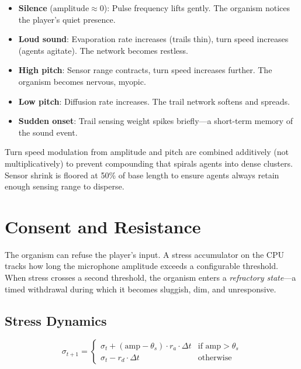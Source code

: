 \documentclass[12pt, titlepage]{article}
\begin{document}
\begin{itemize}
    \item \textbf{Silence} ($\text{amplitude} \approx 0$): Pulse frequency
    lifts gently. The organism notices the player's quiet presence.
    \item \textbf{Loud sound}: Evaporation rate increases (trails thin),
    turn speed increases (agents agitate). The network becomes restless.
    \item \textbf{High pitch}: Sensor range contracts, turn speed increases
    further. The organism becomes nervous, myopic.
    \item \textbf{Low pitch}: Diffusion rate increases. The trail network
    softens and spreads.
    \item \textbf{Sudden onset}: Trail sensing weight spikes briefly---a
    short-term memory of the sound event.
\end{itemize}

Turn speed modulation from amplitude and pitch are combined additively
(not multiplicatively) to prevent compounding that spirals agents into dense
clusters. Sensor shrink is floored at 50\% of base length to ensure agents
always retain enough sensing range to disperse.

\section{Consent and Resistance}
\label{sec:consent}

The organism can refuse the player's input. A stress accumulator on the CPU
tracks how long the microphone amplitude exceeds a configurable threshold.
When stress crosses a second threshold, the organism enters a
\textit{refractory state}---a timed withdrawal during which it becomes
sluggish, dim, and unresponsive.

\subsection{Stress Dynamics}

\begin{equation}
    \sigma_{t+1} = \begin{cases}
    \sigma_t + (\text{amp} - \theta_s) \cdot r_a \cdot \Delta t
        & \text{if } \text{amp} > \theta_s \\
    \sigma_t - r_d \cdot \Delta t & \text{otherwise}
    \end{cases}
\end{equation}
\end{document}
